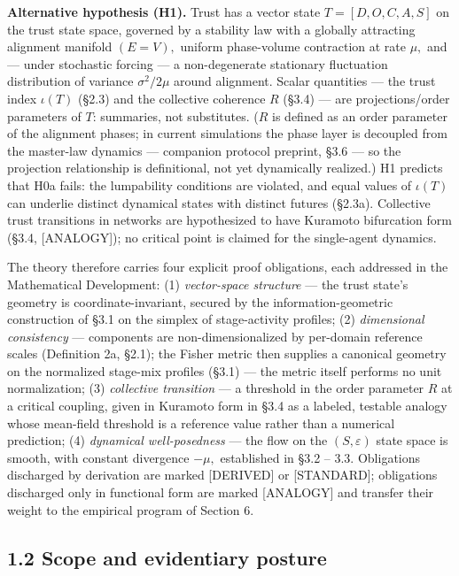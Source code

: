 \documentclass[11pt,twocolumn]{article}
\theoremstyle{gttdef}
\theoremstyle{gttplain}
\begin{document}
\textbf{Alternative hypothesis (H1).} Trust has a vector state $T = [D, O, C, A, S]$ on the trust state space, governed by a stability law with a globally attracting alignment manifold $(E = V),$ uniform phase-volume contraction at rate $\mu,$ and --- under stochastic forcing --- a non-degenerate stationary fluctuation distribution of variance $\sigma^{2}/2\mu$ around alignment. Scalar quantities --- the trust index $\iota(T)$ (\S{}2.3) and the collective coherence $R$ (\S{}3.4) --- are projections/order parameters of $T$: summaries, not substitutes. ($R$ is defined as an order parameter of the alignment phases; in current simulations the phase layer is decoupled from the master-law dynamics --- companion protocol preprint, \S{}3.6 --- so the projection relationship is definitional, not yet dynamically realized.) H1 predicts that H0a fails: the lumpability conditions are violated, and equal values of $\iota(T)$ can underlie distinct dynamical states with distinct futures (\S{}2.3a). Collective trust transitions in networks are hypothesized to have Kuramoto bifurcation form (\S{}3.4, [ANALOGY]); no critical point is claimed for the single-agent dynamics.

The theory therefore carries four explicit proof obligations, each addressed in the Mathematical Development: (1) \emph{vector-space structure} --- the trust state's geometry is coordinate-invariant, secured by the information-geometric construction of \S{}3.1 on the simplex of stage-activity profiles; (2) \emph{dimensional consistency} --- components are non-dimensionalized by per-domain reference scales (Definition 2a, \S{}2.1); the Fisher metric then supplies a canonical geometry on the normalized stage-mix profiles (\S{}3.1) --- the metric itself performs no unit normalization; (3) \emph{collective transition} --- a threshold in the order parameter $R$ at a critical coupling, given in Kuramoto form in \S{}3.4 as a labeled, testable analogy whose mean-field threshold is a reference value rather than a numerical prediction; (4) \emph{dynamical well-posedness} --- the flow on the $(S, \varepsilon)$ state space is smooth, with constant divergence $-\mu,$ established in \S{}3.2 -- 3.3. Obligations discharged by derivation are marked [DERIVED] or [STANDARD]; obligations discharged only in functional form are marked [ANALOGY] and transfer their weight to the empirical program of Section 6.

\subsection*{1.2 Scope and evidentiary posture}
\end{document}
